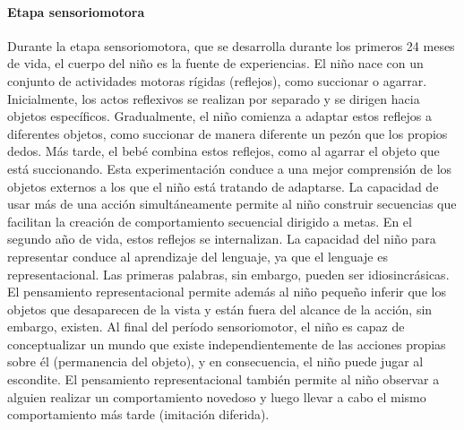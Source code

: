 \documentclass[11pt,letterpaper]{report}
\begin{document}
\paragraph{Etapa sensoriomotora}
Durante la etapa sensoriomotora, que se desarrolla durante los primeros 24
meses de vida, el cuerpo del niño es la fuente de experiencias. El niño nace
con un conjunto de actividades motoras rígidas (reflejos), como succionar o
agarrar. Inicialmente, los actos reflexivos se realizan por separado y se
dirigen hacia objetos específicos. Gradualmente, el niño comienza a adaptar
estos reflejos a diferentes objetos, como succionar de manera diferente un
pezón que los propios dedos. Más tarde, el bebé combina estos reflejos, como al
agarrar el objeto que está succionando. Esta experimentación conduce a una
mejor comprensión de los objetos externos a los que el niño está tratando de
adaptarse. La capacidad de usar más de una acción simultáneamente permite al
niño construir secuencias que facilitan la creación de comportamiento
secuencial dirigido a metas. En el segundo año de vida, estos reflejos se
internalizan. La capacidad del niño para representar conduce al aprendizaje del
lenguaje, ya que el lenguaje es representacional. Las primeras palabras, sin
embargo, pueden ser idiosincrásicas. El pensamiento representacional permite
además al niño pequeño inferir que los objetos que desaparecen de la vista y
están fuera del alcance de la acción, sin embargo, existen. Al final del
período sensoriomotor, el niño es capaz de conceptualizar un mundo que existe
independientemente de las acciones propias sobre él (permanencia del objeto), y
en consecuencia, el niño puede jugar al escondite. El pensamiento
representacional también permite al niño observar a alguien realizar un
comportamiento novedoso y luego llevar a cabo el mismo comportamiento más tarde
(imitación diferida). \cite{Feldman3}
\end{document}
